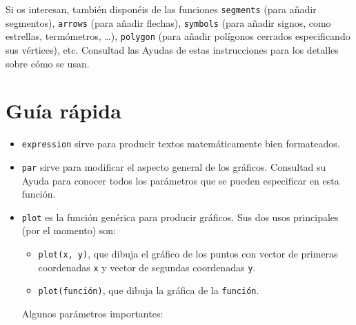 \documentclass[]{book}
\providecommand{\tightlist}{%
  \setlength{\itemsep}{0pt}\setlength{\parskip}{0pt}}
\theoremstyle{definition}
\theoremstyle{definition}
\theoremstyle{definition}
\theoremstyle{remark}
\begin{document}
Si os interesan, también disponéis de las funciones \texttt{segments} (para
añadir segmentos), \texttt{arrows} (para añadir flechas), \texttt{symbols}
(para añadir signos, como estrellas, termómetros, \ldots{}), \texttt{polygon}
(para añadir polígonos cerrados especificando sus vértices), etc.
Consultad las Ayudas de estas instrucciones para los detalles sobre cómo se
usan.

\hypertarget{guia-rapida-3}{%
\section{Guía rápida}\label{guia-rapida-3}}

\begin{itemize}
\item
  \texttt{expression} sirve para producir textos matemáticamente bien formateados.
\item
  \texttt{par} sirve para modificar el aspecto general de los gráficos. Consultad su Ayuda para conocer todos los parámetros que se pueden especificar en esta función.
\item
  \texttt{plot} es la función genérica para producir gráficos. Sus dos usos principales (por el momento) son:

  \begin{itemize}
  \tightlist
  \item
    \texttt{plot(x,\ y)}, que dibuja el gráfico de los puntos con vector de primeras coordenadas \texttt{x} y vector de segundas coordenadas \texttt{y}.
  \item
    \texttt{plot(función)}, que dibuja la gráfica de la \texttt{función}.
  \end{itemize}

  Algunos parámetros importantes:


\end{itemize}
\end{document}
